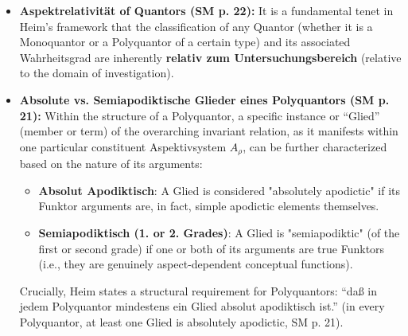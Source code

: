 \documentclass[12pt]{article}
\newcommand{\q}[1]{\enquote{#1}}
\begin{document}
\begin{itemize}
\begin{enumerate}
\begin{equation}
        (\ )_\rho, \left. {}^{\mathrm{f}_\rho} \overline{\left| \mathrm{A}_\rho \right|} \right.^\gamma, (\ )_\rho \vee \beta_\rho \equiv \mathrm{f}_\rho ; \alpha_\rho \vee \alpha_\rho \equiv \mathrm{A}_\rho \vee \beta_\rho \equiv \mathrm{B}_\rho
        \label{eq:polyquantor_continuous_full}
        \tag{4}
        \end{equation}
        Its Wahrheitsgrad, in this case, is related to the \q{measure} or extent of the continuous manifold \( B_\rho \) over which it holds (SM p. 22). This mathematical leap into the continuum is Heim's rigorous foundation for treating subjective perspectives as a continuous field, an absolutely vital step before progressing into physics.
    \end{enumerate}

    \item \textbf{Aspektrelativität of Quantors (SM p. 22):}
    It is a fundamental tenet in Heim's framework that the classification of any Quantor (whether it is a Monoquantor or a Polyquantor of a certain type) and its associated Wahrheitsgrad are inherently \textbf{relativ zum Untersuchungsbereich} (relative to the domain of investigation). 

    \item \textbf{Absolute vs. Semiapodiktische Glieder eines Polyquantors (SM p. 21):}
    Within the structure of a Polyquantor, a specific instance or \q{Glied} (member or term) of the overarching invariant relation, as it manifests within one particular constituent Aspektivsystem \( A_\rho \), can be further characterized based on the nature of its arguments:
    \begin{itemize}
        \item \textbf{Absolut Apodiktisch}: A Glied is considered "absolutely apodictic" if its Funktor arguments are, in fact, simple apodictic elements themselves.
        \item \textbf{Semiapodiktisch (1. or 2. Grades)}: A Glied is "semiapodiktic" (of the first or second grade) if one or both of its arguments are true Funktors (i.e., they are genuinely aspect-dependent conceptual functions).
    \end{itemize}
    Crucially, Heim states a structural requirement for Polyquantors: \q{daß in jedem Polyquantor mindestens ein Glied absolut apodiktisch ist.} (in every Polyquantor, at least one Glied is absolutely apodictic, SM p. 21).


\end{itemize}
\end{document}
